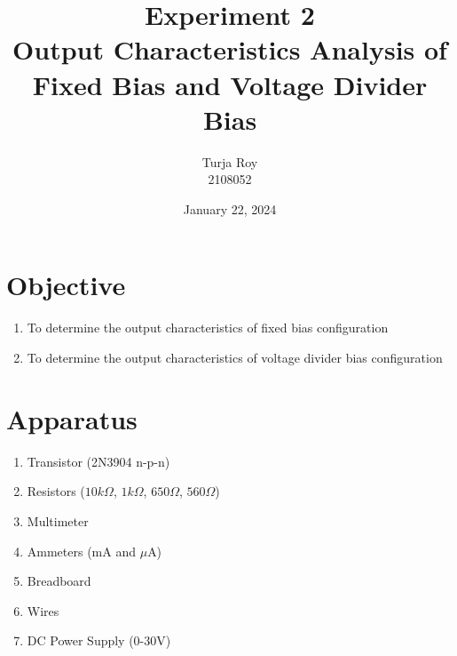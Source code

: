 \documentclass[12pt]{article}
\title{
    Experiment 2\\
    \textbf{Output Characteristics Analysis of Fixed Bias and Voltage Divider Bias}
}
\author{
    Turja Roy\\
    2108052
}
\date{January 22, 2024}
\begin{document}
\maketitle

\section{Objective}
\begin{enumerate}
    \item To determine the output characteristics of fixed bias configuration
    \item To determine the output characteristics of voltage divider bias configuration
\end{enumerate}

\section{Apparatus}
\begin{enumerate}
    \item Transistor (2N3904 n-p-n)
    \item Resistors ($10k\Omega$, $1k\Omega$, $650\Omega$, $560\Omega$)
    \item Multimeter
    \item Ammeters (mA and $\mu$A)
    \item Breadboard
    \item Wires
    \item DC Power Supply (0-30V)
\end{enumerate}
\end{document}
